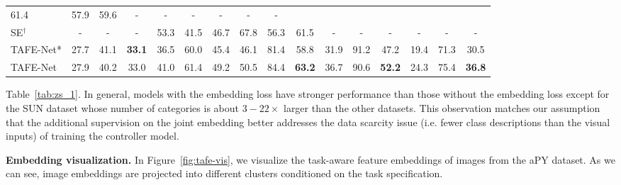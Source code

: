 \documentclass[10pt,twocolumn,letterpaper]{article}
\newcommand{\model}{TAFE-Net\xspace}
\newcommand\minisection[1]{\vspace{2mm}\noindent \textbf{#1}}
\begin{document}
\begin{table*}[t]
{\begin{tabular}{@{}lccc|ccc|ccc|ccc|ccc@{}}
61.4 & 57.9 & 59.6 &-&-&-& -&-&- \\
SE$^\dagger$~\cite{verma2017generalized} &-&-&-& 53.3 & 41.5 & 46.7 
& 67.8 & 56.3 & 61.5  &-&-&-& -&-&- \\
\midrule
\model* & 27.7 & 41.1 & \textbf{33.1} & 36.5 & 60.0 & 45.4 & 46.1 & 81.4 & 58.8 & 31.9 & 91.2 & 47.2 & 19.4 & 71.3 & 30.5 \\
\model & 27.9 & 40.2 & 33.0 & 41.0 & 61.4 & 49.2 & 50.5 & 84.4 & \textbf{63.2} & 36.7 & 90.6 &\textbf{52.2} & 24.3 & 75.4 & \textbf{36.8}\\
\bottomrule
\end{tabular}}
\end{table*}%
Table~\ref{tab:zs_1}. 
In general, models with the embedding loss have stronger performance than those 
without the embedding loss except for the SUN dataset whose number of
categories is about $3-22\times$ larger than the other datasets.  This observation matches our assumption
that the additional supervision on the joint embedding better addresses the data scarcity issue (i.e. fewer
class descriptions than the visual inputs) of training the controller model. 

\minisection{Embedding visualization.}
In Figure~\ref{fig:tafe-vis}, we visualize the task-aware feature embeddings 
of images from the aPY dataset. As we can see, image embeddings are projected 
into different clusters conditioned on the task specification. 
\end{document}

